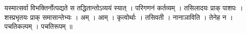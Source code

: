 यस्मात्सर्वा विभक्तिर्नोत्पद्यते स तद्धितान्तोऽव्ययं स्यात् । परिगणनं
कर्तव्यम् । तसिलादयः प्राक् पाशपः । शस्प्रभृतयः प्राक् समासान्तेभ्यः ।
अम् । आम् । कृत्वोर्थाः । तसिवती । नानाञाविति । तेनेह न । पचतिकल्पम् ।
पचतिरूपम् ॥
